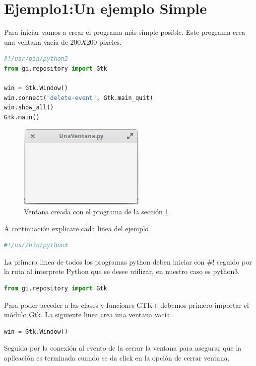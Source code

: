 \documentclass[12pt, twoside]{report}
\begin{document}
\section{Ejemplo1:Un ejemplo Simple}
\label{seccion001}

Para iniciar vamos a crear el programa más simple posible. Este programa crea una ventana vacia de $200X200$ pixeles.

\begin{lstlisting}[language=Python]
#!/usr/bin/python3
from gi.repository import Gtk

win = Gtk.Window()
win.connect("delete-event", Gtk.main_quit)
win.show_all()
Gtk.main()
\end{lstlisting}

\begin{figure}
	\centering
	\includegraphics[width=0.5\linewidth]{UnaVentana.png}
	\caption{Ventana creada con el programa de la sección \ref{seccion001} }
	\label{fig1024}
\end{figure}

A continuación explicare cada linea del ejemplo
\begin{lstlisting}[language=Python]
#!/usr/bin/python3
\end{lstlisting}
La primera linea de todos los programas python deben iniciar con \#! seguido por la ruta al interprete Python que se desee utilizar, en nuestro caso es python3.

\begin{lstlisting}[language=Python]
from gi.repository import Gtk
\end{lstlisting}
Para poder acceder a las clases y funciones GTK+ debemos primero importar el módulo Gtk.  La siguiente linea crea una ventana vacía.

\begin{lstlisting}[language=Python]
win = Gtk.Window()
\end{lstlisting}

Seguida por la conexión al evento de la cerrar la ventana para asegurar que la aplicación es terminada cuando se da click en la opción de cerrar ventana.
\end{document}

